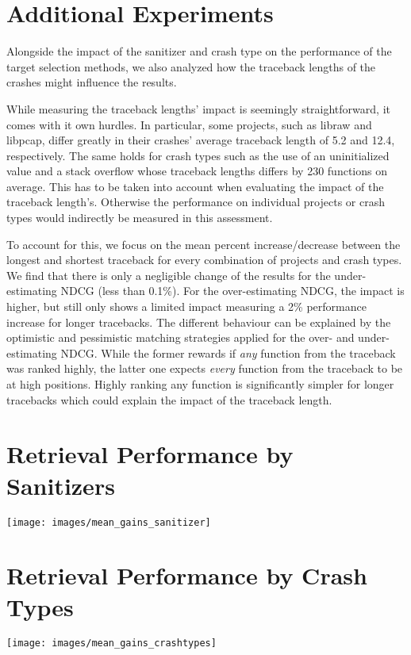 
\section{Additional Experiments}
\cstart
Alongside the impact of the sanitizer and crash type on the performance of the target selection methods, we also analyzed how the traceback lengths of the crashes might influence the results.

While measuring the traceback lengths' impact is seemingly straightforward, it comes with it own hurdles. In particular, some projects, such as libraw and libpcap, differ greatly in their crashes' average traceback length of 5.2 and 12.4, respectively. The same holds for crash types such as the use of an uninitialized value and a stack overflow whose traceback lengths differs by 230 functions on average. This has to be taken into account when evaluating the impact of the traceback length's. Otherwise the performance on individual projects or crash types would indirectly be measured in this assessment.

To account for this, we focus on the mean percent increase/decrease between the longest and shortest traceback for every combination of projects and crash types. We find that there is only a negligible change of the results for the under-estimating NDCG (less than 0.1\%). For the over-estimating NDCG, the impact is higher, but still only shows a limited impact measuring a 2\% performance increase for longer tracebacks. The different behaviour can be explained by the optimistic and pessimistic matching strategies applied for the over- and under-estimating NDCG. While the former rewards if \emph{any} function from the traceback was ranked highly, the latter one expects \emph{every} function from the traceback to be at high positions. Highly ranking any function is significantly simpler for longer tracebacks which could explain the impact of the traceback length.

\cend

\section{Retrieval Performance by Sanitizers}
\label{sec:appx-break-down-sanitizers}

\vspace{2em}

\begin{center}
    \texttt{[image: images/mean\_gains\_sanitizer]}  
\end{center}

\section{Retrieval Performance by Crash Types}
\label{sec:appx-break-down-crashtypes}

\vspace{2em}

\begin{center}
    \texttt{[image: images/mean\_gains\_crashtypes]} 
\end{center}